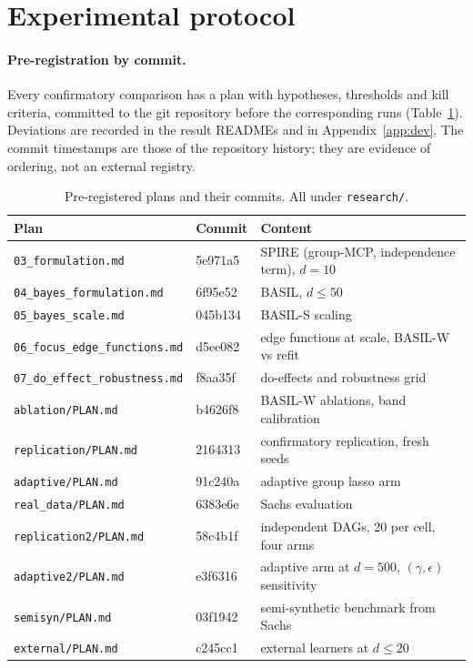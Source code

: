 \documentclass[11pt,a4paper]{article}
\begin{document}
\section{Experimental protocol}
\label{sec:protocol}

\paragraph{Pre-registration by commit.} Every confirmatory comparison has a plan with hypotheses, thresholds and kill criteria, committed to the git repository before the corresponding runs (Table~\ref{tab:prereg}). Deviations are recorded in the result READMEs and in Appendix~\ref{app:dev}. The commit timestamps are those of the repository history; they are evidence of ordering, not an external registry.

\begin{table}[t]
\centering
\caption{Pre-registered plans and their commits. All under \texttt{research/}.}
\label{tab:prereg}
\small
\begin{tabular}{@{}llp{7.2cm}@{}}
\toprule
Plan & Commit & Content \\
\midrule
\texttt{03\_formulation.md} & 5e971a5 & SPIRE (group-MCP, independence term), $d=10$ \\
\texttt{04\_bayes\_formulation.md} & 6f95e52 & BASIL, $d\le 50$ \\
\texttt{05\_bayes\_scale.md} & 045b134 & BASIL-S scaling \\
\texttt{06\_focus\_edge\_functions.md} & d5ee082 & edge functions at scale, BASIL-W vs refit \\
\texttt{07\_do\_effect\_robustness.md} & f8aa35f & do-effects and robustness grid \\
\texttt{ablation/PLAN.md} & b4626f8 & BASIL-W ablations, band calibration \\
\texttt{replication/PLAN.md} & 2164313 & confirmatory replication, fresh seeds \\
\texttt{adaptive/PLAN.md} & 91c240a & adaptive group lasso arm \\
\texttt{real\_data/PLAN.md} & 6383e6e & Sachs evaluation \\
\texttt{replication2/PLAN.md} & 58c4b1f & independent DAGs, 20 per cell, four arms \\
\texttt{adaptive2/PLAN.md} & e3f6316 & adaptive arm at $d=500$, $(\gamma,\epsilon)$ sensitivity \\
\texttt{semisyn/PLAN.md} & 03f1942 & semi-synthetic benchmark from Sachs \\
\texttt{external/PLAN.md} & c245cc1 & external learners at $d\le20$ \\
\bottomrule
\end{tabular}
\end{table}
\end{document}

